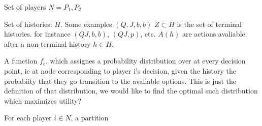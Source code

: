 \documentclass{article}
\begin{document}
Set of players
$N={P_1, P_2}$

Set of histories:
$H$. Some examples $(Q,J,b,b)$
$Z \subset H$ is the set of terminal histories. for instance $(QJ,b,b)$, $(QJ,p)$, etc. 
$A(h)$ are actions avaliable after a non-terminal history $h \in H$.

A function $f_c$. which assignes a probability distribution over at every decision point, ie at node corresponding to player i's decision, given the history the probabiity that they go transition to the avaliable options. This is just the definition of that distribution, we would like to find the optimal such distribution which maximizes utility?

For each player $i \in N$, a partition 
\end{document}
